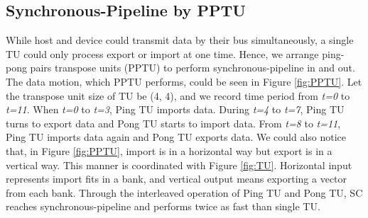 \documentclass[10pt,journal,compsoc]{IEEEtran}
\begin{document}
\subsection{Synchronous-Pipeline by PPTU}
 \label{cha:PPTU}
While host and device could transmit data by their bus simultaneously, a single TU could only process export or import at one time. Hence, we arrange ping-pong pairs transpose units (PPTU) to perform synchronous-pipeline in and out. The data motion, which PPTU performs, could be seen in Figure \ref{fig:PPTU}. Let the transpose unit size of TU be (4, 4), and we record time period from \textit{t=0} to \textit{t=11}. When \textit{t=0} to \textit{t=3}, Ping TU imports data. During \textit{t=4} to \textit{t=7}, Ping TU turns to export data and Pong TU starts to import data. From \textit{t=8} to \textit{t=11}, Ping TU imports data again and Pong TU exports data. We could also notice that, in Figure \ref{fig:PPTU}, import is in a horizontal way but export is in a vertical way. This manner is coordinated with Figure \ref{fig:TU}. Horizontal input represents import  fits in a bank, and vertical output means exporting a vector from each bank.
Through the interleaved operation of Ping TU and Pong TU, SC reaches synchronous-pipeline and performs twice as fast than single TU.
\end{document}
